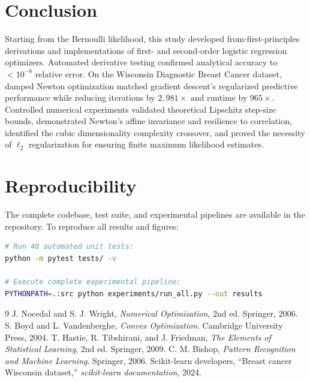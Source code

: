 \documentclass[11pt,a4paper]{article}
\theoremstyle{remark}\newtheorem{remark}{Remark}
\begin{document}
\section{Conclusion}
Starting from the Bernoulli likelihood, this study developed from-first-principles derivations and implementations of first- and second-order logistic regression optimizers. Automated derivative testing confirmed analytical accuracy to $< 10^{-8}$ relative error. On the Wisconsin Diagnostic Breast Cancer dataset, damped Newton optimization matched gradient descent's regularized predictive performance while reducing iterations by $2,981\times$ and runtime by $965\times$. Controlled numerical experiments validated theoretical Lipschitz step-size bounds, demonstrated Newton's affine invariance and resilience to correlation, identified the cubic dimensionality complexity crossover, and proved the necessity of $\ell_2$ regularization for ensuring finite maximum likelihood estimates.

\section*{Reproducibility}
The complete codebase, test suite, and experimental pipelines are available in the repository. To reproduce all results and figures:
\begin{lstlisting}[language=bash]
# Run 40 automated unit tests:
python -m pytest tests/ -v

# Execute complete experimental pipeline:
PYTHONPATH=.:src python experiments/run_all.py --out results
\end{lstlisting}

\begin{thebibliography}{9}
 J. Nocedal and S. J. Wright, \emph{Numerical Optimization}, 2nd ed. Springer, 2006.
 S. Boyd and L. Vandenberghe, \emph{Convex Optimization}. Cambridge University Press, 2004.
 T. Hastie, R. Tibshirani, and J. Friedman, \emph{The Elements of Statistical Learning}, 2nd ed. Springer, 2009.
 C. M. Bishop, \emph{Pattern Recognition and Machine Learning}. Springer, 2006.
 Scikit-learn developers, ``Breast cancer Wisconsin dataset,'' \emph{scikit-learn documentation}, 2024.
\end{thebibliography}
\end{document}
